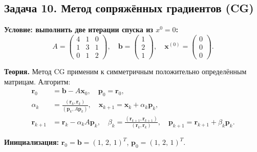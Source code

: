 \documentclass{article}
\begin{document}
\subsection*{Задача 10. Метод сопряжённых градиентов (CG)}
\textbf{Условие: выполнить две итерации спуска из $x^0 = 0$:}
$$
A = \begin{pmatrix} 4 & 1 & 0 \\ 1 & 3 & 1 \\ 0 & 1 & 2 \end{pmatrix}, \quad 
\textbf{b} = \begin{pmatrix} 1 \\ 2 \\ 1 \end{pmatrix}, \quad 
\textbf{x}^{(0)} = \begin{pmatrix} 0 \\ 0 \\ 0 \end{pmatrix}.
$$

\textbf{Теория.} Метод CG применим к симметричным положительно определённым матрицам. Алгоритм:
\begin{align*}
\textbf{r}_0 &= \textbf{b} - A\textbf{x}_0, \quad \textbf{p}_0 = \textbf{r}_0, \\
\alpha_k &= \frac{(\textbf{r}_k, \textbf{r}_k)}{(\textbf{p}_k, A\textbf{p}_k)}, \quad 
\textbf{x}_{k+1} = \textbf{x}_k + \alpha_k \textbf{p}_k, \\
\textbf{r}_{k+1} &= \textbf{r}_k - \alpha_k A\textbf{p}_k, \quad 
\beta_k = \frac{(\textbf{r}_{k+1}, \textbf{r}_{k+1})}{(\textbf{r}_k, \textbf{r}_k)}, \quad 
\textbf{p}_{k+1} = \textbf{r}_{k+1} + \beta_k \textbf{p}_k.
\end{align*}

\textbf{Инициализация:} $\textbf{r}_0 = \textbf{b} = (1,\, 2,\, 1)^T$, $\textbf{p}_0 = (1,\, 2,\, 1)^T$.
\end{document}
